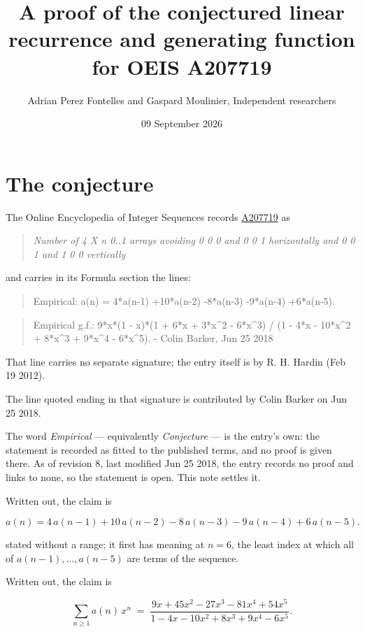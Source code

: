 \documentclass[11pt]{article}
\title{A proof of the conjectured linear recurrence and generating function for OEIS A207719}
\author{Adrian Perez Fontelles and Gaspard Moulinier, Independent researchers}
\date{09 September 2026}
\theoremstyle{definition}
\begin{document}
\maketitle
\section{The conjecture}

The Online Encyclopedia of Integer Sequences records \href{https://oeis.org/A207719}{A207719} as

\begin{quote}\itshape Number of 4 X n 0..1 arrays avoiding 0 0 0 and 0 0 1 horizontally and 0 0 1 and 1 0 0 vertically\end{quote}

and carries in its Formula section the lines:

\begin{quote}\ttfamily Empirical: a(n) = 4*a(n-1) +10*a(n-2) -8*a(n-3) -9*a(n-4) +6*a(n-5).\end{quote}

\begin{quote}\ttfamily Empirical g.f.: 9*x*(1 - x)*(1 + 6*x + 3*x\textasciicircum{}2 - 6*x\textasciicircum{}3) / (1 - 4*x - 10*x\textasciicircum{}2 + 8*x\textasciicircum{}3 + 9*x\textasciicircum{}4 - 6*x\textasciicircum{}5). - Colin Barker, Jun 25 2018\end{quote}

That line carries no separate signature; the entry itself is by R. H. Hardin (Feb 19 2012).

The line quoted ending in that signature is contributed by Colin Barker on Jun 25 2018.

The word {\itshape Empirical} --- equivalently {\itshape Conjecture} --- is the entry's own: the statement is recorded as fitted to the published terms, and no proof is given there. As of revision 8, last modified Jun 25 2018, the entry records no proof and links to none, so the statement is open. This note settles it.

Written out, the claim is

\[a(n) = 4\,a(n-1) + 10\,a(n-2) - 8\,a(n-3) - 9\,a(n-4) + 6\,a(n-5).\]

stated without a range; it first has meaning at $n = 6$, the least index at which all of $a(n-1),\dots,a(n-5)$ are terms of the sequence.

Written out, the claim is

\[\sum_{n \ge 1} a(n)\,x^n \;=\; \frac{9x + 45x^{2} - 27x^{3} - 81x^{4} + 54x^{5}}{1 - 4x - 10x^{2} + 8x^{3} + 9x^{4} - 6x^{5}}.\]
\end{document}
